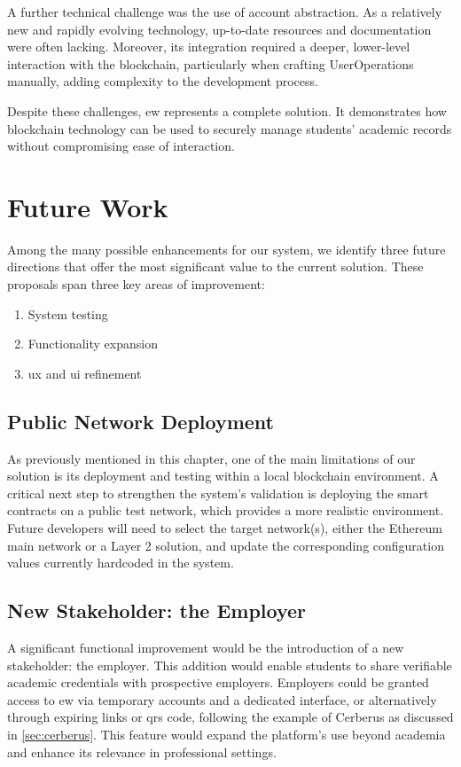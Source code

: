 A further technical challenge was the use of account abstraction. As a relatively new and rapidly evolving technology, up-to-date resources and documentation were often lacking. Moreover, its integration required a deeper, lower-level interaction with the blockchain, particularly when crafting UserOperations manually, adding complexity to the development process.

Despite these challenges, \gls{ew} represents a complete solution. It demonstrates how blockchain technology can be used to securely manage students' academic records without compromising ease of interaction.

\section{Future Work}
Among the many possible enhancements for our system, we identify three future directions that offer the most significant value to the current solution. These proposals span three key areas of improvement:
\begin{enumerate}
\item System testing
\item Functionality expansion
\item \gls{ux} and \gls{ui} refinement
\end{enumerate}

\subsection{Public Network Deployment}
As previously mentioned in this chapter, one of the main limitations of our solution is its deployment and testing within a local blockchain environment.
A critical next step to strengthen the system’s validation is deploying the smart contracts on a public test network, which provides a more realistic environment. Future developers will need to select the target network(s), either the Ethereum main network or a Layer 2 solution, and update the corresponding configuration values currently hardcoded in the system.

\subsection{New Stakeholder: the Employer}
A significant functional improvement would be the introduction of a new stakeholder: the employer. This addition would enable students to share verifiable academic credentials with prospective employers. Employers could be granted access to \gls{ew} via temporary accounts and a dedicated interface, or alternatively through expiring links or \glspl{qr} code, following the example of Cerberus \cite{tariq2022cerberus} as discussed in \cref{sec:cerberus}. This feature would expand the platform’s use beyond academia and enhance its relevance in professional settings.

